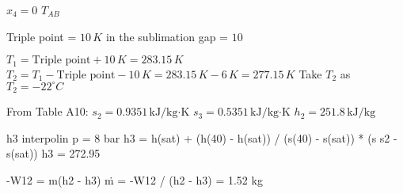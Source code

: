 \( x_4 = 0 \)  
\( T_{AB} \)  

Triple point = \( 10 \, K \) in the sublimation gap = \( 10 \)  

\( T_1 = \text{Triple point} + 10 \, K = 283.15 \, K \)  
\( T_2 = T_1 - \text{Triple point} - 10 \, K = 283.15 \, K - 6 \, K = 277.15 \, K \)  
Take \( T_2 \) as \( T_2 = -22^\circ C \)  

From Table A10:  
\( s_2 = 0.9351 \, \text{kJ/kg·K} \)  
\( s_3 = 0.5351 \, \text{kJ/kg·K} \)  
\( h_2 = 251.8 \, \text{kJ/kg} \)

h3 interpolin  
p = 8 bar  
h3 = h(sat) + (h(40) - h(sat)) / (s(40) - s(sat)) * (s s2 - s(sat))  
h3 = 272.95  

-W12 = m(h2 - h3)  
ṁ = -W12 / (h2 - h3) = 1.52 kg
